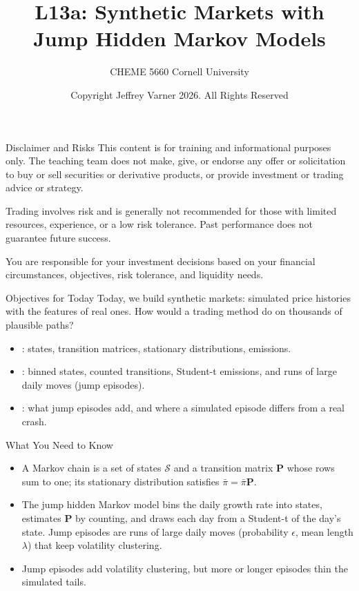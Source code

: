 \documentclass[aspectratio=169,11pt]{beamer}
\title{\texorpdfstring{{\vnheavy L13a}}{L13a}: Synthetic Markets with Jump Hidden Markov Models}
\subtitle{CHEME 5660 Cornell University}
\author{Copyright Jeffrey Varner 2026. All Rights Reserved}
\newcommand{\Sc}{\mathcal{S}}
\newcommand{\Pb}{\mathbf{P}}
\begin{document}
\vntitlepage

\begin{frame}{Disclaimer and Risks}
  \vspace{0.6em}
  \textbf{} This content is for training and informational
  purposes only. The teaching team does not make, give, or endorse any offer or
  solicitation to buy or sell securities or derivative products, or provide
  investment or trading advice or strategy.

  \vspace{1.1em}
  \textbf{} Trading involves risk and is generally not recommended for
  those with limited resources, experience, or a low risk tolerance. Past
  performance does not guarantee future success.

  \vspace{1.1em}
  \textbf{} You are responsible for your investment decisions
  based on your financial circumstances, objectives, risk tolerance, and
  liquidity needs.
\end{frame}

\begin{frame}{Objectives for Today}
  Today, we build synthetic markets: simulated price histories with the features of
  real ones. How would a trading method do on thousands of plausible paths?

  \vspace{0.5em}
  {\large\textbf{}}
  \begin{itemize}\setlength{\itemsep}{0.4em}
    \item {}: states, transition
      matrices, stationary distributions, emissions.
    \item {}: binned states, counted
      transitions, Student-t emissions, and runs of large daily moves (jump episodes).
    \item {}: what jump episodes add, and where a
      simulated episode differs from a real crash.
  \end{itemize}
\end{frame}

\begin{frame}{What You Need to Know}
  \begin{itemize}\setlength{\itemsep}{0.4em}
    \item A Markov chain is a set of states $\Sc$ and a transition matrix $\Pb$ whose
      rows sum to one; its stationary distribution satisfies $\bar{\pi}=\bar{\pi}\Pb$.
    \item The jump hidden Markov model bins the daily growth rate into states,
      estimates $\Pb$ by counting, and draws each day from a Student-t of the day's
      state. Jump episodes are runs of large daily moves (probability $\epsilon$,
      mean length $\lambda$) that keep volatility clustering.
    \item Jump episodes add volatility clustering, but more or longer episodes thin
      the simulated tails.
  \end{itemize}

\end{frame}
\end{document}

